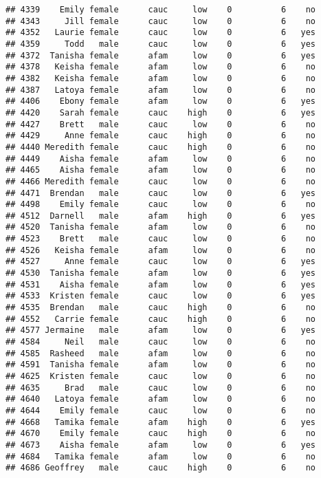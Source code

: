 \documentclass[
]{article}
\begin{document}
\begin{verbatim}
## 4339    Emily female      cauc     low    0          6    no
## 4343     Jill female      cauc     low    0          6    no
## 4352   Laurie female      cauc     low    0          6   yes
## 4359     Todd   male      cauc     low    0          6   yes
## 4372  Tanisha female      afam     low    0          6   yes
## 4378   Keisha female      afam     low    0          6    no
## 4382   Keisha female      afam     low    0          6    no
## 4387   Latoya female      afam     low    0          6    no
## 4406    Ebony female      afam     low    0          6   yes
## 4420    Sarah female      cauc    high    0          6   yes
## 4427    Brett   male      cauc     low    0          6    no
## 4429     Anne female      cauc    high    0          6    no
## 4440 Meredith female      cauc    high    0          6    no
## 4449    Aisha female      afam     low    0          6    no
## 4465    Aisha female      afam     low    0          6    no
## 4466 Meredith female      cauc     low    0          6    no
## 4471  Brendan   male      cauc     low    0          6   yes
## 4498    Emily female      cauc     low    0          6    no
## 4512  Darnell   male      afam    high    0          6   yes
## 4520  Tanisha female      afam     low    0          6    no
## 4523    Brett   male      cauc     low    0          6    no
## 4526   Keisha female      afam     low    0          6    no
## 4527     Anne female      cauc     low    0          6   yes
## 4530  Tanisha female      afam     low    0          6   yes
## 4531    Aisha female      afam     low    0          6   yes
## 4533  Kristen female      cauc     low    0          6   yes
## 4535  Brendan   male      cauc    high    0          6    no
## 4552   Carrie female      cauc    high    0          6    no
## 4577 Jermaine   male      afam     low    0          6   yes
## 4584     Neil   male      cauc     low    0          6    no
## 4585  Rasheed   male      afam     low    0          6    no
## 4591  Tanisha female      afam     low    0          6    no
## 4625  Kristen female      cauc     low    0          6    no
## 4635     Brad   male      cauc     low    0          6    no
## 4640   Latoya female      afam     low    0          6    no
## 4644    Emily female      cauc     low    0          6    no
## 4668   Tamika female      afam    high    0          6   yes
## 4670    Emily female      cauc    high    0          6    no
## 4673    Aisha female      afam     low    0          6   yes
## 4684   Tamika female      afam     low    0          6    no
## 4686 Geoffrey   male      cauc    high    0          6    no

\end{verbatim}
\end{document}
